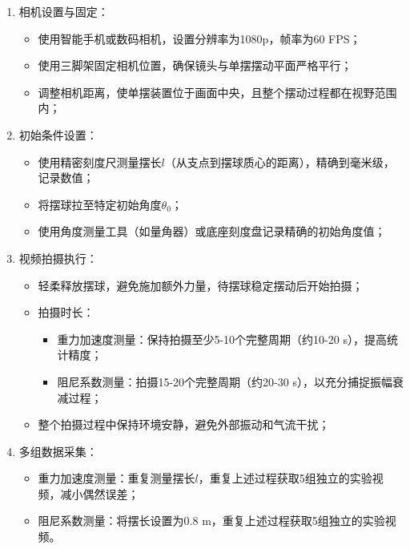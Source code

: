 \begin{enumerate}[leftmargin=*]
    \item 相机设置与固定：
    \begin{itemize}
        \item 使用智能手机或数码相机，设置分辨率为1080p，帧率为60 FPS；
        \item 使用三脚架固定相机位置，确保镜头与单摆摆动平面严格平行；
        \item 调整相机距离，使单摆装置位于画面中央，且整个摆动过程都在视野范围内；
    \end{itemize}
    
    \item 初始条件设置：
    \begin{itemize}
        \item 使用精密刻度尺测量摆长$l$（从支点到摆球质心的距离），精确到毫米级，记录数值；
        \item 将摆球拉至特定初始角度$\theta_0$；
        \item 使用角度测量工具（如量角器）或底座刻度盘记录精确的初始角度值；
    \end{itemize}
    
    \item 视频拍摄执行：
    \begin{itemize}
        \item 轻柔释放摆球，避免施加额外力量，待摆球稳定摆动后开始拍摄；
        \item 拍摄时长：
        \begin{itemize}
            \item 重力加速度测量：保持拍摄至少5-10个完整周期（约10-20 s），提高统计精度；
            \item 阻尼系数测量：拍摄15-20个完整周期（约20-30 s），以充分捕捉振幅衰减过程；
        \end{itemize}
        \item 整个拍摄过程中保持环境安静，避免外部振动和气流干扰；
    \end{itemize}
    
    \item 多组数据采集：
    \begin{itemize}
        \item 重力加速度测量：重复测量摆长$l$，重复上述过程获取5组独立的实验视频，减小偶然误差；
        \item 阻尼系数测量：将摆长设置为0.8 m，重复上述过程获取5组独立的实验视频。
    \end{itemize}
\end{enumerate}
